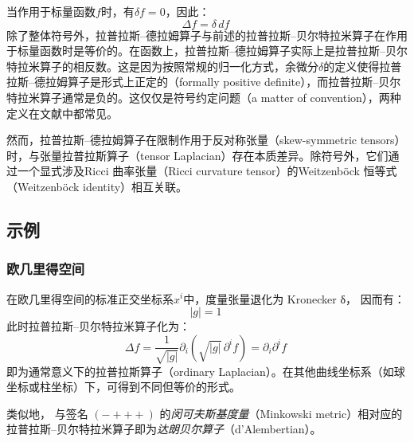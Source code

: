 当作用于标量函数$f$时，有$\delta f = 0$，因此：
\[
\Delta f = \delta\, df~
\]
除了整体符号外，拉普拉斯–德拉姆算子与前述的拉普拉斯–贝尔特拉米算子在作用于标量函数时是等价的。在函数上，拉普拉斯–德拉姆算子实际上是拉普拉斯–贝尔特拉米算子的相反数。这是因为按照常规的归一化方式，余微分$\delta$的定义使得拉普拉斯–德拉姆算子是形式上正定的（formally positive definite），而拉普拉斯–贝尔特拉米算子通常是负的。这仅仅是符号约定问题（a matter of convention），两种定义在文献中都常见。

然而，拉普拉斯–德拉姆算子在限制作用于反对称张量（skew-symmetric tensors）时，与张量拉普拉斯算子（tensor Laplacian）存在本质差异。除符号外，它们通过一个显式涉及Ricci 曲率张量（Ricci curvature tensor）的Weitzenböck 恒等式（Weitzenböck identity）相互关联。
\subsection{示例}
\subsubsection{欧几里得空间}
在欧几里得空间的标准正交坐标系$x^{i}$中，度量张量退化为 Kronecker δ，
因而有：
\[
|g| = 1~
\]
此时拉普拉斯–贝尔特拉米算子化为：
\[
\Delta f
= \frac{1}{\sqrt{|g|}} \partial_{i} \left( \sqrt{|g|}\, \partial^{i} f \right)
= \partial_{i} \partial^{i} f~
\]
即为通常意义下的拉普拉斯算子（ordinary Laplacian）。在其他曲线坐标系（如球坐标或柱坐标）下，可得到不同但等价的形式。

类似地，
与签名 $(- + + +)$ 的\emph{闵可夫斯基度量}（Minkowski metric）相对应的
拉普拉斯–贝尔特拉米算子即为\emph{达朗贝尔算子}（d’Alembertian）。
